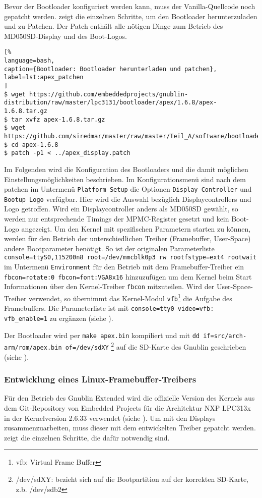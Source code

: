 Bevor der Bootloader konfiguriert werden kann, muss der Vanilla-Quellcode noch gepatcht werden.  zeigt die einzelnen Schritte, um den Bootloader herunterzuladen und zu Patchen. Der Patch enthält alle nötigen Dinge zum Betrieb des MD050SD-Display und des Boot-Logos.

\begin{lstlisting}[%
language=bash,
caption={Bootloader: Bootloader herunterladen und patchen},
label=lst:apex_patchen
]
$ wget https://github.com/embeddedprojects/gnublin-distribution/raw/master/lpc3131/bootloader/apex/1.6.8/apex-1.6.8.tar.gz
$ tar xvfz apex-1.6.8.tar.gz
$ wget https://github.com/siredmar/master/raw/master/Teil_A/software/bootloader/apex_display.patch
$ cd apex-1.6.8
$ patch -p1 < ../apex_display.patch
\end{lstlisting}

Im Folgenden wird die Konfiguration des Bootloaders und die damit möglichen Einstellungsmöglichkeiten beschrieben. Im Konfigurationsmenü sind nach dem patchen im Untermenü \lstinline|Platform Setup| die Optionen \lstinline|Display Controller| und \lstinline|Bootup Logo| verfügbar. Hier wird die Auswahl bezüglich Displaycontrollers und Logo getroffen. Wird ein Displaycontroller anders als MD050SD gewählt, so werden nur entsprechende Timings der MPMC-Register gesetzt und kein Boot-Logo angezeigt. 
Um den Kernel mit spezifischen Parametern starten zu können, werden für den Betrieb der unterschiedlichen Treiber (Framebuffer, User-Space) andere Bootparameter benötigt. So ist der originalen Parameterliste 
\lstinline{console=ttyS0,115200n8 root=/dev/mmcblk0p3 rw rootfstype=ext4 rootwait} im Untermenü \lstinline|Environment| für den Betrieb mit dem Framebuffer-Treiber ein \lstinline|fbcon=rotate:0 fbcon=font:VGA8x16| hinzuzufügen um dem Kernel beim Start Informationen über den Kernel-Treiber \lstinline|fbcon| mitzuteilen. Wird der User-Space-Treiber verwendet, so übernimmt das Kernel-Modul \lstinline|vfb|\footnote{vfb: Virtual Frame Buffer} die Aufgabe des Framebuffers. Die Parameterliste ist mit \lstinline|console=tty0 video=vfb: vfb_enable=1| zu ergänzen (siehe \cite{LinuxKernelFBCON}).

Der Bootloader wird per \lstinline|make apex.bin| kompiliert und mit \lstinline|dd if=src/arch-arm/rom/apex.bin of=/dev/sdXY| \footnote{/dev/sdXY: bezieht sich auf die Bootpartition auf der korrekten SD-Karte, z.b. /dev/sdb2} auf die SD-Karte des Gnublin geschrieben (siehe \cite{GnublinWiki2013a}).

\subsubsection{Entwicklung eines Linux-Framebuffer-Treibers}
Für den Betrieb des Gnublin Extended wird die offizielle Version des Kernels aus dem Git-Repository von Embedded Projects für die Architektur NXP LPC313x in der Kernelversion 2.6.33 verwendet (siehe \cite{GnublinWiki2013b}). Um mit den Displays zusammenzuarbeiten, muss dieser mit dem entwickelten Treiber gepatcht werden.  zeigt die einzelnen Schritte, die dafür notwendig sind.

